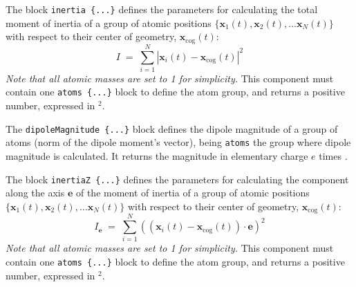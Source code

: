 
The block \texttt{inertia~\{...\}} defines the
parameters for calculating the total moment of inertia of a group of atomic
positions $\{ \mathbf{x}_1(t), \mathbf{x}_2(t), \ldots \mathbf{x}_N(t)
\}$ with respect to their center of geometry,
$\mathbf{x}_{\mathrm{cog}}(t)$:
\begin{equation}
  \label{eq:colvar_inertia}
  I \; = \; \sum_{i=1}^{N} \left|\mathbf{x}_{i}(t) -
      \mathbf{x}_{\mathrm{cog}}(t)\right|^{2}
\end{equation}
\emph{Note that all atomic masses are set to 1 for simplicity.}
This component must contain one \texttt{atoms~\{...\}} block to
define the atom group, and returns a positive number, expressed in
\lengthunit$^{2}$.

\begin{cvcoptions}
\item %
\end{cvcoptions}


The \texttt{dipoleMagnitude~\{...\}} block defines the dipole magnitude of a group of atoms (norm of the dipole moment's vector), being \texttt{atoms} the group where dipole magnitude is calculated.
It returns the magnitude in elementary charge $e$ times \lengthunit.

\begin{cvcoptions}
\item %
\end{cvcoptions}



The block \texttt{inertiaZ~\{...\}} defines the
parameters for calculating the component along the axis $\mathbf{e}$ of the moment of inertia of a group of atomic
positions $\{ \mathbf{x}_1(t), \mathbf{x}_2(t), \ldots \mathbf{x}_N(t)
\}$ with respect to their center of geometry,
$\mathbf{x}_{\mathrm{cog}}(t)$:
\begin{equation}
  \label{eq:colvar_inertia_z}
  I_{\mathbf{e}} \; = \; \sum_{i=1}^{N} \left(\left(\mathbf{x}_{i}(t) -
      \mathbf{x}_{\mathrm{cog}}(t)\right)\cdot\mathbf{e}\right)^{2}
\end{equation}
\emph{Note that all atomic masses are set to 1 for simplicity.}
This component must contain one \texttt{atoms~\{...\}} block to
define the atom group, and returns a positive number, expressed in
\lengthunit$^{2}$.


